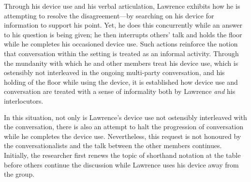 \begin{revisedsubmission}
Through his device use and his verbal articulation, Lawrence exhibits how he is attempting to resolve the disagreement---by searching on his device for information to support his point.
Yet, he does this concurrently while an answer to his question is being given; he then interrupts others' talk and holds the floor while he completes his occasioned device use.
Such actions reinforce the notion that conversation within the setting is treated as an informal activity.
Through the mundanity with which he and other members treat his device use, which is ostensibly not interleaved in the ongoing multi-party conversation, and his holding of the floor while using the device, it is established how device use and conversation are treated with a sense of informality both by Lawrence \textit{and} his interlocutors.

In this situation, not only is Lawrence's device use not ostensibly interleaved with the conversation, there is also an attempt to halt the progression of conversation while he completes the device use.
Nevertheless, this request is not honoured by the conversationalists and the talk between the other members continues.
Initially, the researcher first renews the topic of shorthand notation at the table before others continue the discussion while Lawrence uses his device away from the group.
\end{revisedsubmission}






